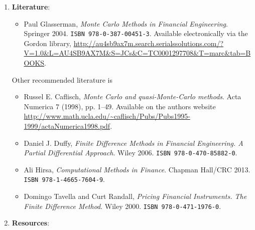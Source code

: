 \documentclass[final, 12pt]{article}
\begin{document}
{\begin{enumerate}
\item
\textbf{Literature}:\\

\begin{itemize}
\item Paul Glasserman, \textit{Monte Carlo Methods in Financial Engineering}. Springer 2004. \texttt{ISBN 978-0-387-00451-3}. Available electronically via the Gordon library, \url{http://au4sb9ax7m.search.serialssolutions.com/?V=1.0&L=AU4SB9AX7M&S=JCs&C=TC0001297708&T=marc&tab=BOOKS}.
\end{itemize}

\newpage

Other recommended literature is
\begin{itemize}
\item Russel E. Caflisch, \textit{Monte Carlo and quasi-Monte-Carlo methods}. Acta Numerica 7 (1998), pp. 1--49. Available on the authors website \url{http://www.math.ucla.edu/~caflisch/Pubs/Pubs1995-1999/actaNumerica1998.pdf}.
\item Daniel J. Duffy, \textit{Finite Difference Methods in Financial Engineering. A Partial Differential Approach}. Wiley 2006. \texttt{ISBN 978-0-470-85882-0}.
\item Ali Hirsa, \textit{Computational Methods in Finance}. Chapman Hall/CRC 2013. \texttt{ISBN 978-1-4665-7604-9}.
\item Domingo Tavella and Curt Randall, \textit{Pricing Financial Instruments. The Finite Difference Method}. Wiley 2000. \texttt{ISBN 978-0-471-1976-0}.
\end{itemize}



\vspace{5pt}

\item 
\textbf{Resources}:


\end{enumerate}}
\end{document}

